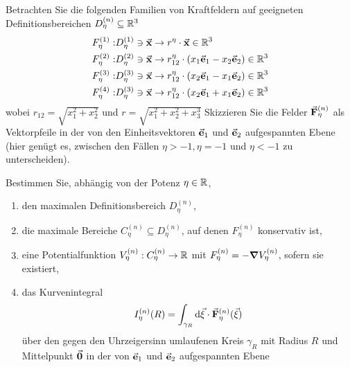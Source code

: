 \begin{Problem}
	Betrachten Sie die folgenden Familien von Kraftfeldern auf geeigneten Definitionsbereichen $D_\eta^{(n)}  \subseteq \mathbb{R}^3$
	\begin{align*}
		F_\eta^{(1)}:& D_\eta^{(1)}\ni \va x\to r^\eta\cdot \va x\in \mathbb{R}^3\\
		F_\eta^{(2)}:& D_\eta^{(2)}\ni\va x \to r_{12}^\eta\cdot(x_1\va e_1-x_2\va e_2)\in \mathbb{R}^3\\
		F_\eta^{(3)}:& D_\eta^{(3)}\ni \va x\to r_{12}^\eta\cdot\left( x_2\va e_1-x_1\va e_2 \right) \in\mathbb{R}^3\\
		F_\eta^{(4)}:&D_\eta^{(3)}\ni \va x\to r_{12}^\eta\cdot\left( x_2\va e_1+x_1\va e_2 \right) \in \mathbb{R}^3
	\end{align*}
	wobei $r_{12}=\sqrt{x_1^2+x_2^2} $ und $r=\sqrt{x_1^2+x_2^2+x_3^3} $
	Skizzieren Sie die Felder $\va F_\eta^{(n)}$ als Vektorpfeile in der von den Einheitsvektoren $\va e_1$ und $\va e_2$ aufgespannten Ebene (hier genügt es, zwischen den Fällen $\eta > -1, \eta = -1$ und $\eta < -1$ zu unterscheiden). 
	
	Bestimmen Sie, abhängig von der Potenz $\eta \in \mathbb{R}$,
	\begin{enumerate}
		\item den maximalen Definitionsbereich $D_\eta^{(n)}$,
		\item die maximale Bereiche $C_\eta^{(n)}\subseteq D_\eta^{(n)}$, auf denen $F_\eta^{(n)}$ konservativ ist,
		\item eine Potentialfunktion $V_\eta^{(n)}:C_{\eta}^{(n)}\to \mathbb{R}$ mit $F_\eta^{(n)}=-\grad{V_\eta^{(n)}}$, sofern sie existiert,
		\item das Kurvenintegral
		\[I_\eta^{(n)}(R)=\int_{\gamma_R}\dd{\va\xi}\cdot\va F_\eta^{(n)}(\va\xi)\]
		über den gegen den Uhrzeigersinn umlaufenen Kreis $\gamma_R$ mit Radius $R$ und Mittelpunkt $\va0$ in der von $\va e_1$ und $\va e_2$ aufgespannten Ebene
		\begin{center}
		\end{center}
	\end{enumerate}
\end{Problem}
